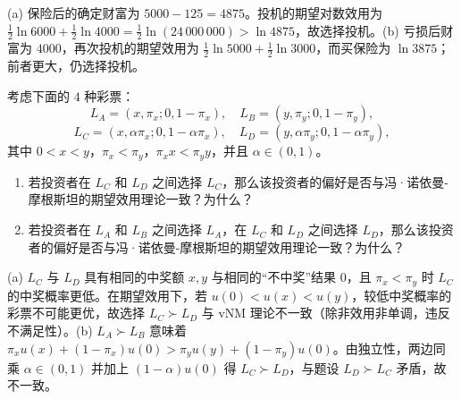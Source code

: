 \begin{solution}
(a) 保险后的确定财富为 $5000-125=4875$。投机的期望对数效用为 $\frac12\ln6000+\frac12\ln4000=\frac12\ln(24\,000\,000)>\ln4875$，故选择投机。(b) 亏损后财富为 $4000$，再次投机的期望效用为 $\frac12\ln5000+\frac12\ln3000$，而买保险为 $\ln3875$；前者更大，仍选择投机。
\end{solution}
\begin{problem}
 考虑下面的 $4$ 种彩票：
\[
    L_A=(x,\pi_x;0,1-\pi_x),\quad L_B=(y,\pi_y;0,1-\pi_y),
\]
\[
    L_C=(x,\alpha\pi_x;0,1-\alpha\pi_x),\quad L_D=(y,\alpha\pi_y;0,1-\alpha\pi_y),
\]
其中 $0<x<y$，$\pi_x<\pi_y$，$\pi_x x<\pi_y y$，并且 $\alpha\in(0,1)$。
\begin{enumerate}[label=(\alph*)]
    \item 若投资者在 $L_C$ 和 $L_D$ 之间选择 $L_C$，那么该投资者的偏好是否与冯·诺依曼-摩根斯坦的期望效用理论一致？为什么？
    \item 若投资者在 $L_A$ 和 $L_B$ 之间选择 $L_A$，在 $L_C$ 和 $L_D$ 之间选择 $L_D$，那么该投资者的偏好是否与冯·诺依曼-摩根斯坦的期望效用理论一致？为什么？
\end{enumerate}
\end{problem}
\begin{solution}
(a) $L_C$ 与 $L_D$ 具有相同的中奖额 $x,y$ 与相同的“不中奖”结果 $0$，且 $\pi_x<\pi_y$ 时 $L_C$ 的中奖概率更低。在期望效用下，若 $u(0)<u(x)<u(y)$，较低中奖概率的彩票不可能更优，故选择 $L_C\succ L_D$ 与 vNM 理论不一致（除非效用非单调，违反不满足性）。(b) $L_A\succ L_B$ 意味着 $\pi_x u(x)+(1-\pi_x)u(0)>\pi_y u(y)+(1-\pi_y)u(0)$。由独立性，两边同乘 $\alpha\in(0,1)$ 并加上 $(1-\alpha)u(0)$ 得 $L_C\succ L_D$，与题设 $L_D\succ L_C$ 矛盾，故不一致。
\end{solution}
